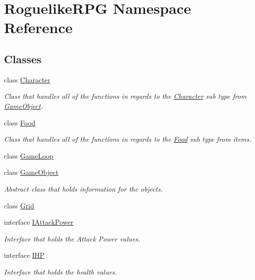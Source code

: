 \hypertarget{namespace_roguelike_r_p_g}{}\section{Roguelike\+R\+PG Namespace Reference}
\label{namespace_roguelike_r_p_g}
\subsection*{Classes}
\begin{DoxyCompactItemize}
\item 
class \mbox{\hyperlink{class_roguelike_r_p_g_1_1_character}{Character}}
\begin{DoxyCompactList}\small\item\em Class that handles all of the functions in regards to the \mbox{\hyperlink{class_roguelike_r_p_g_1_1_character}{Character}} sub type from \mbox{\hyperlink{class_roguelike_r_p_g_1_1_game_object}{Game\+Object}}. \end{DoxyCompactList}\item 
class \mbox{\hyperlink{class_roguelike_r_p_g_1_1_food}{Food}}
\begin{DoxyCompactList}\small\item\em Class that handles all of the functions in regards to the \mbox{\hyperlink{class_roguelike_r_p_g_1_1_food}{Food}} sub type from items. \end{DoxyCompactList}\item 
class \mbox{\hyperlink{class_roguelike_r_p_g_1_1_game_loop}{Game\+Loop}}
\item 
class \mbox{\hyperlink{class_roguelike_r_p_g_1_1_game_object}{Game\+Object}}
\begin{DoxyCompactList}\small\item\em Abstract class that holds information for the objects. \end{DoxyCompactList}\item 
class \mbox{\hyperlink{class_roguelike_r_p_g_1_1_grid}{Grid}}
\item 
interface \mbox{\hyperlink{interface_roguelike_r_p_g_1_1_i_attack_power}{I\+Attack\+Power}}
\begin{DoxyCompactList}\small\item\em Interface that holds the Attack Power values. \end{DoxyCompactList}\item 
interface \mbox{\hyperlink{interface_roguelike_r_p_g_1_1_i_h_p}{I\+HP}}
\begin{DoxyCompactList}\small\item\em Interface that holds the health values. \end{DoxyCompactList}\item 

\end{DoxyCompactItemize}
